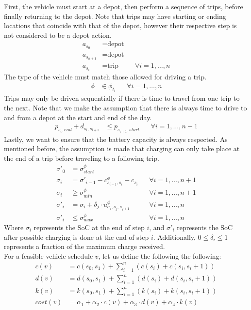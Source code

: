 \documentclass[]{article}
\begin{document}
First, the vehicle must start at a depot, then perform a sequence of trips, before finally returning to the depot. Note that trips may have starting or ending locations that coincide with that of the depot, however their respective step is not considered to be a depot action.
\begin{align}
  a_{s_0} &= \text{depot} && \\
  a_{s_{n+1}} &= \text{depot} && \\ 
  a_{s_i} &= \text{trip} && \forall i = 1, \dots, n
\end{align}
The type of the vehicle must match those allowed for driving a trip. 
\begin{align}
  \phi &\in \phi_{t_i} && \forall i = 1, \dots, n
\end{align}
Trips may only be driven sequentially if there is time to travel from one trip to the next. Note that we make the assumption that there is always time to drive to and from a depot at the start and end of the day. 
\begin{align}
  p_{s_i,end} + d_{s_i, s_{i+1}} &\leq p_{s_{i+1},start} && \forall i = 1, \dots, n-1
\end{align}
Lastly, we want to ensure that the battery capacity is always respected. As mentioned before, the assumption is made that charging can only take place at the end of a trip before traveling to a following trip.
\begin{align}
  \sigma'_0 &= \sigma^\phi_{start} \\
  \sigma_{i} &= \sigma'_{i-1} - c^\phi_{s_{i-1}, s_{i}} - c_{s_{i}} && \forall i = 1, \dots, n + 1 \\
  \sigma_{i} &\geq \sigma^\phi_{min} && \forall i = 1, \dots, n + 1 \\
  \sigma'_{i} &= \sigma_{i} + \delta_j \cdot u^\phi_{\sigma_{i},s_{j}, s_{j+1}} && \forall i = 1, \dots, n \\
  \sigma'_{i} &\leq \sigma^\phi_{max} && \forall i = 1, \dots, n
\end{align}
Where $\sigma_i$ represents the SoC at the end of step $i$, and $\sigma'_i$ represents the SoC after possible charging is done at the end of step $i$. Additionally, $0 \leq \delta_i \leq 1$ represents a fraction of the maximum charge received. \\
For a feasible vehicle schedule $v$, let us define the following the following:
\begin{align}
  c(v) &= c(s_0, s_1) + \sum^{n}_{i = 1}(c(s_i) + c(s_i, s_i + 1))  \\
  d(v) &= d(s_0, s_1) + \sum^{n}_{i = 1}(d(s_i) + d(s_i, s_i + 1))  \\
  k(v) &= k(s_0, s_1) + \sum^{n}_{i = 1}(k(s_i) + k(s_i, s_i + 1))  \\
  cost(v) &= \alpha_1 + \alpha_2 \cdot c(v) + \alpha_3 \cdot d(v) + \alpha_4 \cdot k(v) 
\end{align}
\end{document}
